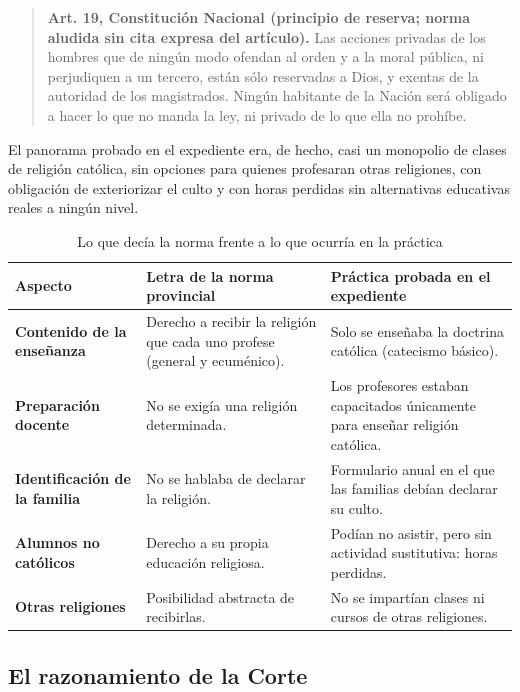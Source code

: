 \documentclass[12pt,oneside]{book}
\begin{document}
\begin{quote}
\textbf{Art. 19, Constitución Nacional (principio de reserva; norma aludida sin cita expresa del artículo).} Las acciones privadas de los hombres que de ningún modo ofendan al orden y a la moral pública, ni perjudiquen a un tercero, están sólo reservadas a Dios, y exentas de la autoridad de los magistrados. Ningún habitante de la Nación será obligado a hacer lo que no manda la ley, ni privado de lo que ella no prohíbe.
\end{quote}

El panorama probado en el expediente era, de hecho, casi un monopolio de clases de religión católica, sin opciones para quienes profesaran otras religiones, con obligación de exteriorizar el culto y con horas perdidas sin alternativas educativas reales a ningún nivel.

\begin{table}[H]
\centering
\caption{Lo que decía la norma frente a lo que ocurría en la práctica}
\small
\begin{tabularx}{\textwidth}{
    >{\raggedright\arraybackslash}p{}
    >{\raggedright\arraybackslash}X
    >{\raggedright\arraybackslash}X
}
\toprule
\textbf{Aspecto} & \textbf{Letra de la norma provincial} & \textbf{Práctica probada en el expediente} \\
\midrule
\textbf{Contenido de la enseñanza} & Derecho a recibir la religión que cada uno profese (general y ecuménico). & Solo se enseñaba la doctrina católica (catecismo básico). \\
\textbf{Preparación docente} & No se exigía una religión determinada. & Los profesores estaban capacitados únicamente para enseñar religión católica. \\
\textbf{Identificación de la familia} & No se hablaba de declarar la religión. & Formulario anual en el que las familias debían declarar su culto. \\
\textbf{Alumnos no católicos} & Derecho a su propia educación religiosa. & Podían no asistir, pero sin actividad sustitutiva: horas perdidas. \\
\textbf{Otras religiones} & Posibilidad abstracta de recibirlas. & No se impartían clases ni cursos de otras religiones. \\
\bottomrule
\end{tabularx}
\end{table}

\subsection{El razonamiento de la Corte}
\end{document}
